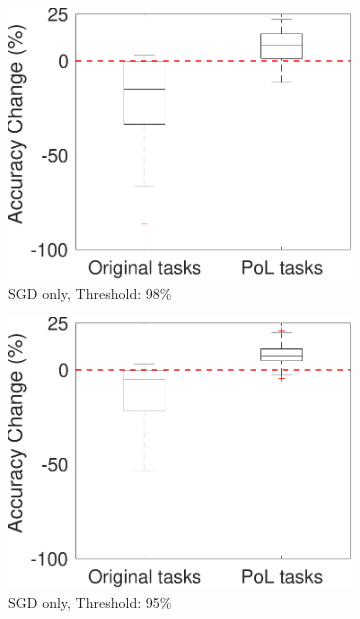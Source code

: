 \begin{figure}[!t]
     \begin{subfigure}{.3\textwidth}
        \includegraphics[width=1\textwidth]{other/figures/98-122-4_v1.pdf}
        \caption{SGD only, Threshold: 98\%}
        \label{98_box_SGD}
    \end{subfigure}
    \begin{subfigure}{.3\textwidth}
        \includegraphics[width=1\textwidth]{other/figures/95-123-4_v1.pdf}
        \caption{SGD only, Threshold: 95\%}
        \label{95_box_SGD}
    \end{subfigure}
    \begin{subfigure}{.3\textwidth}

\end{subfigure}
\end{figure}
